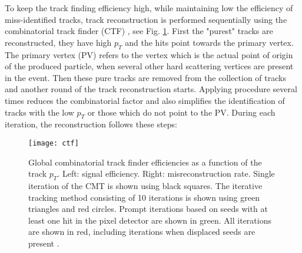 To keep the track finding efficiency high, while maintaining low the efficiency of miss-identified tracks, track reconstruction is performed sequentially using the combinatorial track finder (CTF) \cite{combined_track_finding}, see Fig. \ref{ctf}. First the "purest" tracks are reconstructed, they have high $p_T$ and the hits point towards the primary vertex. The primary vertex (PV) refers to the vertex which is the actual point of origin of the produced particle, when several other hard scattering vertices are present in the event. Then these pure tracks are removed from the collection of tracks and another round of the track reconstruction starts. Applying procedure several times reduces the combinatorial factor and also simplifies the identification of tracks with the low $p_T$ or those which do not point to the PV. During each iteration, the reconstruction follows these steps:


 \begin{figure}[H]
  \centering
  \texttt{[image: ctf]}
  \caption[Global combinatorial track finder efficiencies. ]{Global combinatorial track finder efficiencies as a function of the track $p_T$. Left: signal efficiency. Right:  misreconstruction rate. Single iteration of the CMT is shown using black squares. The iterative tracking method consisting of 10 iterations is shown using green triangles and red circles. Prompt iterations based on seeds with at least one hit in the pixel detector are shown in green. All iterations are shown in red, including iterations when displaced seeds are present \cite{PFalgo}.  }\label{ctf}
\end{figure}


